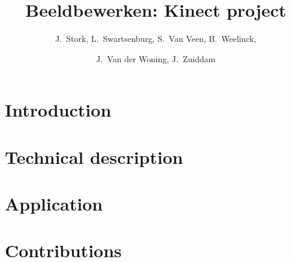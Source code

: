 \documentclass{scrreprt}
\title{
  Beeldbewerken: Kinect project
}
\author{
  J.\ Stork, L.\ Swartsenburg,  S.\ Van Veen, B.\ Weelinck,\and J.\ Van der Woning, J.\ Zuiddam 
} %
\begin{document}
\maketitle
\tableofcontents


\chapter{Introduction}\label{ch:introduction}
    


\chapter{Technical description}
\label{ch:technical}
    


\chapter{Application} 
\label{ch:application}
    


\appendix

\chapter{Contributions} 
\label{ch:appendixA}

    

\printbibliography
\end{document}
